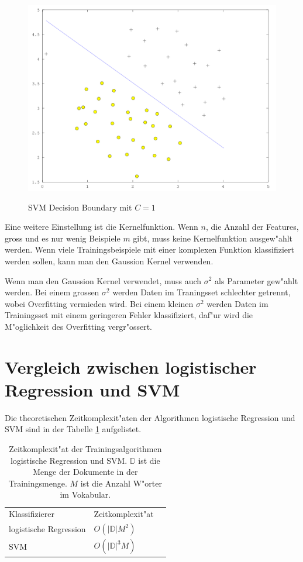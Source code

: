 \documentclass[12pt,a4paper,twoside]{article}
\begin{document}
\begin{figure}
  \includegraphics[scale=0.5]{c1}
  \centering
  \label{fig:c1}
  \caption{SVM Decision Boundary mit $C = 1$}
\end{figure}

Eine weitere Einstellung ist die Kernelfunktion. Wenn $n$, die Anzahl der Features, gross und es nur wenig Beispiele $m$ gibt, muss keine Kernelfunktion ausgew"ahlt werden. Wenn viele Trainingsbeispiele mit einer komplexen Funktion klassifiziert werden sollen, kann man den Gaussion Kernel verwenden.

Wenn man den Gaussion Kernel verwendet, muss auch $\sigma^2$ als Parameter gew"ahlt werden. Bei einem grossen $\sigma^2$ werden Daten im Traningsset schlechter getrennt, wobei Overfitting vermieden wird. Bei einem kleinen $\sigma^2$ werden Daten im Trainingsset mit einem geringeren Fehler klassifiziert, daf"ur wird die M"oglichkeit des Overfitting vergr"ossert.


\section{Vergleich zwischen logistischer Regression und SVM}
\label{sec:comp}

Die theoretischen Zeitkomplexit"aten der Algorithmen logistische Regression und SVM sind in der Tabelle \ref{tab:complexity} aufgelistet.  

\begin{table}
  \centering
  \begin{tabular}{l l l}
    Klassifizierer & Zeitkomplexit"at  \\
    logistische Regression & $O(|\mathbb{D}|M^2)$ \\
    SVM & $O(|\mathbb{D}|^3M)$ \\
  \end{tabular}
  \caption{Zeitkomplexit"at der Trainingsalgorithmen logistische Regression und SVM. $\mathbb{D}$ ist die Menge der Dokumente in der Trainingsmenge. $M$ ist die Anzahl W"orter im Vokabular.}
  \label{tab:complexity}
\end{table}
\end{document}
